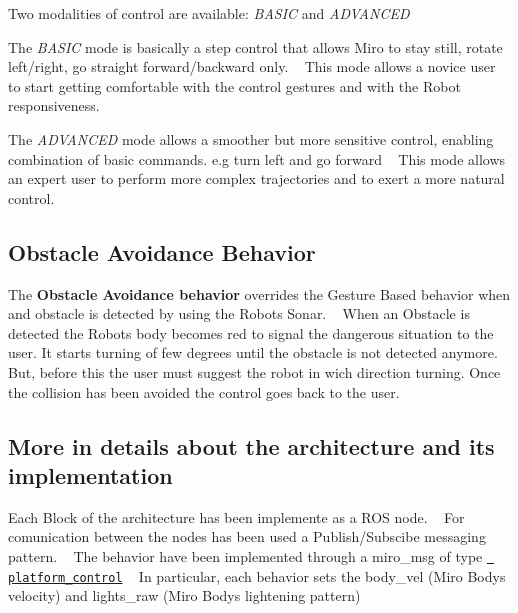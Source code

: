  Two modalities of control are available\+: {\itshape B\+A\+S\+IC} and {\itshape A\+D\+V\+A\+N\+C\+ED} 
\begin{DoxyItemize}
\item The {\itshape B\+A\+S\+IC} mode is basically a step control that allows Miro to stay still, rotate left/right, go straight forward/backward only. ~\newline
 This mode allows a novice user to start getting comfortable with the control gestures and with the Robot responsiveness. 
\item The {\itshape A\+D\+V\+A\+N\+C\+ED} mode allows a smoother but more sensitive control, enabling combination of basic commands. e.\+g turn left and go forward ~\newline
 This mode allows an expert user to perform more complex trajectories and to exert a more natural control.
\end{DoxyItemize}\hypertarget{index_aob_sec}{}\subsection{Obstacle Avoidance Behavior}\label{index_aob_sec}
The {\bfseries{Obstacle Avoidance behavior}} overrides the Gesture Based behavior when and obstacle is detected by using the Robot\textquotesingle{}s Sonar. ~\newline
 When an Obstacle is detected the Robot\textquotesingle{}s body becomes red to signal the dangerous situation to the user. It starts turning of few degrees until the obstacle is not detected anymore. ~\newline
 But, before this the user must suggest the robot in wich direction turning. Once the collision has been avoided the control goes back to the user. \hypertarget{index_det_sec}{}\subsection{More in details about the architecture and its implementation}\label{index_det_sec}
Each Block of the architecture has been implemente as a R\+OS node. ~\newline
 For comunication between the nodes has been used a Publish/\+Subscibe messaging pattern. ~\newline
 The behavior have been implemented through a miro\+\_\+msg of type \href{https://consequential.bitbucket.io/platform_control.msg}\texttt{ platform\+\_\+control} ~\newline
 In particular, each behavior sets the body\+\_\+vel (Miro Body\textquotesingle{}s velocity) and lights\+\_\+raw (Miro Body\textquotesingle{}s lightening pattern) 